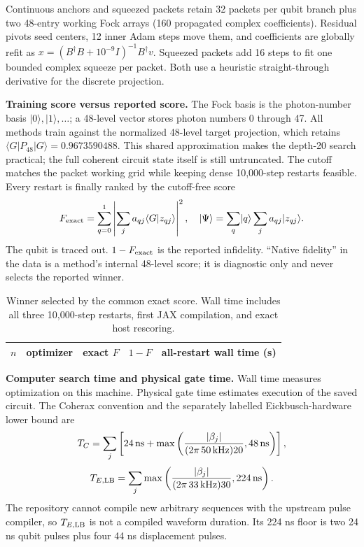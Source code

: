 \documentclass[10pt]{article}
\newcommand{\ket}[1]{\lvert #1\rangle}
\begin{document}
Continuous anchors and squeezed packets retain 32 packets per qubit branch
plus two 48-entry working Fock arrays (160 propagated complex coefficients).
Residual pivots seed centers, 12 inner Adam steps move them, and coefficients
are globally refit as
$x=(B^\dagger B+10^{-9}I)^{-1}B^\dagger v$. Squeezed packets add 16 steps to
fit one bounded complex squeeze per packet. Both use a heuristic
straight-through derivative for the discrete projection.

\textbf{Training score versus reported score.}
The Fock basis is the photon-number basis $\ket0,\ket1,\ldots$; a 48-level
vector stores photon numbers 0 through 47.
All methods train against the normalized 48-level target projection, which
retains $\langle G|P_{48}|G\rangle=0.9673590488$. This shared approximation
makes the depth-20 search practical; the full coherent circuit state itself is
still untruncated. The cutoff matches the packet working grid while keeping
dense 10,000-step restarts feasible. Every restart is
finally ranked by the cutoff-free score
\[
F_{\rm exact}=\sum_{q=0}^1\left|\sum_j a_{qj}\langle G|z_{qj}\rangle\right|^2,
\quad
\ket\Psi=\sum_q\ket q\sum_j a_{qj}\ket{z_{qj}}.
\]
The qubit is traced out. $1-F_{\rm exact}$ is the reported infidelity.
``Native fidelity'' in the data is a method's internal 48-level score; it is
diagnostic only and never selects the reported winner.

\begin{table}[H]
\centering\scriptsize
\setlength{\tabcolsep}{3.2pt}
\begin{tabular}{r l r r r}
\toprule
$n$ & optimizer & exact $F$ & $1-F$ & all-restart wall time (s)\\
\midrule
\bottomrule
\end{tabular}
\caption{Winner selected by the common exact score. Wall time includes all
three 10,000-step restarts, first JAX compilation, and exact host rescoring.}
\end{table}

\newpage
\textbf{Computer search time and physical gate time.}
Wall time measures optimization on this machine. Physical gate time estimates
execution of the saved circuit. The Coherax convention and the separately
labelled Eickbusch-hardware lower bound are
\[
T_C=\sum_j\left[24\,{\rm ns}+\max\left(
\frac{|\beta_j|}{(2\pi\,50\,{\rm kHz})20},48\,{\rm ns}\right)\right],
\]
\[
T_{E,{\rm LB}}=\sum_j\max\left(
\frac{|\beta_j|}{(2\pi\,33\,{\rm kHz})30},224\,{\rm ns}\right).
\]
The repository cannot compile new arbitrary sequences with the upstream pulse
compiler, so $T_{E,{\rm LB}}$ is not a compiled waveform duration. Its 224 ns
floor is two 24 ns qubit pulses plus four 44 ns displacement pulses.
\end{document}
